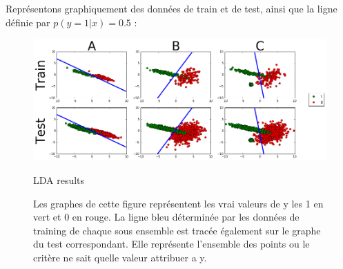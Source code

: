 \documentclass{article}
\begin{document}
\begin{enumerate}
\begin{enumerate}[label=(\alph*)]
Représentons graphiquement des données de train et de test, ainsi que la ligne définie par \mbox{$p(y=1|x)=0.5$} : \\ 
\begin{figure}[h!]
    \centering
    \includegraphics[scale=0.45]{LDA}
    \label{fig:LDA}
    \caption{LDA results}
    \caption*{Les graphes de cette figure représentent les vrai valeurs de y les 1 en vert et 0 en rouge. La ligne bleu déterminée par les données de training de chaque sous ensemble est tracée également sur le graphe du test correspondant. Elle représente l'ensemble des points ou le critère ne sait quelle valeur attribuer a y.}
\end{figure}
\end{enumerate}


\end{enumerate}
\end{document}
